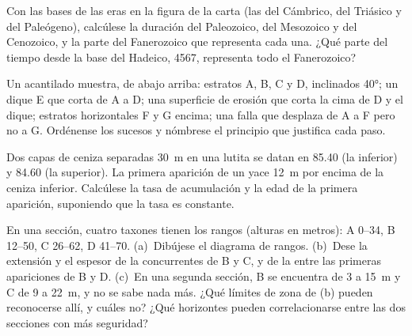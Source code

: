 \begin{exercise}[$\star$]\label{exo:b1:stratigraphic-scale:2}
Con las bases de las eras en la figura de la carta (las del Cámbrico, del Triásico y del Paleógeno), calcúlese la duración del Paleozoico, del Mesozoico y del Cenozoico, y la parte del Fanerozoico que representa cada una. ¿Qué parte del tiempo desde la base del Hadeico, \qty{4567}{\Ma}, representa todo el Fanerozoico?
\end{exercise}

\begin{exercise}[$\star$]\label{exo:b1:stratigraphic-scale:3}
Un acantilado muestra, de abajo arriba: estratos A, B, C y D, inclinados \ang{40}; un dique E que corta de A a D; una superficie de erosión que corta la cima de D y el dique; estratos horizontales F y G encima; una falla que desplaza de A a F pero no a G. Ordénense los sucesos y nómbrese el principio que justifica cada paso.
\end{exercise}

\begin{exercise}[$\star$]\label{exo:b1:stratigraphic-scale:4}
Dos capas de ceniza separadas \qty{30}{m} en una lutita se datan en \qty{85.40}{\Ma} (la inferior) y \qty{84.60}{\Ma} (la superior). La primera aparición de un  yace \qty{12}{m} por encima de la ceniza inferior. Calcúlese la tasa de acumulación y la edad de la primera aparición, suponiendo que la tasa es constante.
\end{exercise}

\begin{exercise}[$\star\star$]\label{exo:b1:stratigraphic-scale:5}
En una sección, cuatro taxones tienen los rangos (alturas en metros): A 0--34, B 12--50, C 26--62, D 41--70. (a)~Dibújese el diagrama de rangos. (b)~Dese la extensión y el espesor de la  concurrentes de B y C, y de la  entre las primeras apariciones de B y D. (c)~En una segunda sección, B se encuentra de 3 a 15~m y C de 9 a 22~m, y no se sabe nada más. ¿Qué límites de zona de (b) pueden reconocerse allí, y cuáles no? ¿Qué horizontes pueden correlacionarse entre las dos secciones con más seguridad?
\end{exercise}

